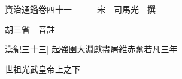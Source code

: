 






























































資治通鑑卷四十一　　　宋　司馬光　撰

胡三省　音註

漢紀三十三|{
	起強圉大淵獻盡屠維赤奮若凡三年}


世祖光武皇帝上之下

